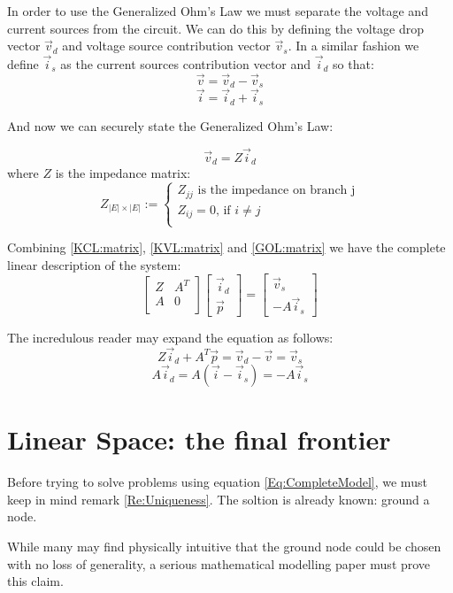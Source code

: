 \documentclass{comjnl}
\begin{document}
In order to use the Generalized Ohm's Law we must separate the voltage and current sources from the circuit. We can do this by defining the voltage drop vector $\vec{v}_{d}$ and voltage source contribution vector $\vec{v}_{s}$. In a similar fashion we define $\vec{i}_{s}$ as the current sources contribution vector and $\vec{i}_{d}$ so that:
$$ \vec{v} = \vec{v}_{d} - \vec{v}_{s}$$
$$ \vec{i} = \vec{i}_{d} +  \vec{i}_{s}$$

And now we can securely state the Generalized Ohm's Law:
\begin{theorem}[GOL]
\label{GOL:matrix}
$$ \vec{v}_{d} = Z \vec{i}_{d} $$
where $Z$ is the impedance matrix:
$$ Z_{|E|\times|E|} :=
\begin{cases} 
Z_{jj} \mbox{ is the impedance on branch j}\\
Z_{ij}=0 \mbox{, if } i\neq j \\
\end{cases}$$
\end{theorem}
Combining \ref{KCL:matrix}, \ref{KVL:matrix} and \ref{GOL:matrix} we have the complete linear description of the system:
\begin{equation}
\label{Eq:CompleteModel}
\begin{bmatrix}
	Z & A^T \\
	A & 0   \\
\end{bmatrix}
\begin{bmatrix}
	\vec{i}_d \\
	\vec{p}
\end{bmatrix}
=
\begin{bmatrix}
	\vec{v}_s \\
	-A\vec{i}_s
\end{bmatrix}
\end{equation}

The incredulous reader may expand the equation as follows:
$$ Z\vec{i}_d + A^T\vec{p} = \vec{v}_d - \vec{v} = \vec{v}_s $$
$$ A\vec{i}_d = A(\vec{i}-\vec{i}_s) = - A\vec{i}_s  $$

\section{Linear Space: the final frontier}
Before trying to solve problems using equation \ref{Eq:CompleteModel}, we must keep in mind remark \ref{Re:Uniqueness}. The soltion is already known: ground a node.

While many may find physically intuitive that the ground node could be chosen with no loss of generality, a serious mathematical modelling paper must prove this claim. 
\end{document}
